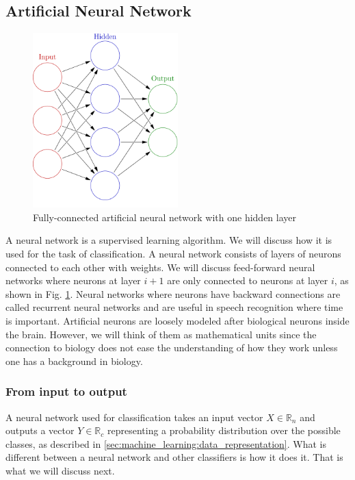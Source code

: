 \documentclass{kththesis}
\begin{document}
\subsection{Artificial Neural Network}
\begin{figure}
\centering
\includegraphics[width=0.5\textwidth]{images/ann.png}
\caption{Fully-connected artificial neural network with one hidden layer}
\label{fig:ann}
\end{figure}

A neural network is a supervised learning algorithm. We will discuss how it is used for the task of classification. A neural network consists of layers  of neurons connected to each other with weights. We will discuss feed-forward neural networks where neurons at layer $i+1$ are only connected to neurons at layer $i$, as shown in Fig. \ref{fig:ann}. Neural networks where neurons have backward connections are called recurrent neural networks and are useful in speech recognition where time is important.  Artificial neurons are loosely modeled after biological  neurons inside the brain. However, we will  think of them as mathematical units since the connection to biology does not ease the understanding of  how they work unless one has a background in biology.

\subsubsection{From input to output}
A neural network used for classification takes an input vector $X \in \mathbb{R}_{n}$ and outputs a vector $Y \in \mathbb{R}_{c}$ representing a probability distribution over the possible classes, as described in \ref{sec:machine_learning:data_representation}. What is different between a neural network and other classifiers is how it does it. That is what we will discuss next. 
\end{document}

